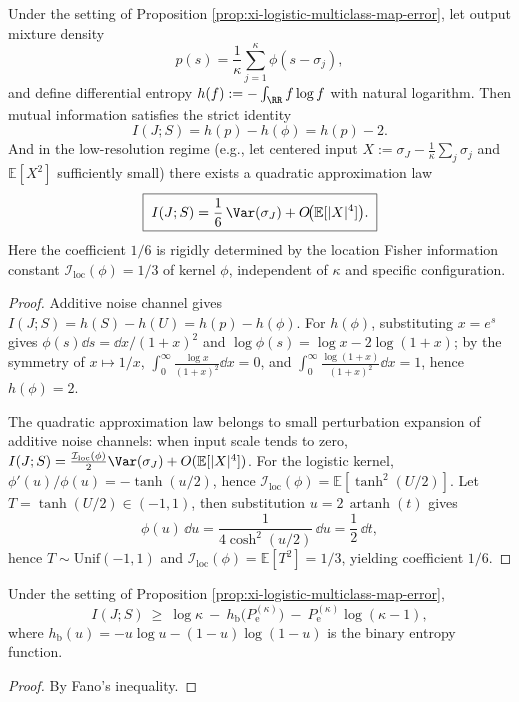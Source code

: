 \begin{proposition}\label{prop:xi-logistic-mutual-information-low-resolution}
Under the setting of Proposition \ref{prop:xi-logistic-multiclass-map-error}, let output mixture density
\[
p(s)=\frac{1}{\kappa}\sum_{j=1}^{\kappa}\phi(s-\sigma_j),
\]
and define differential entropy \(h(f):=-\int_{\RR}f\log f\) with natural logarithm.
Then mutual information satisfies the strict identity
\[
\boxed{\;I(J;S)=h(p)-h(\phi)=h(p)-2.\;}
\]
And in the low-resolution regime (e.g., let centered input \(X:=\sigma_J-\frac{1}{\kappa}\sum_{j}\sigma_j\) and \(\mathbb E[X^{2}]\) sufficiently small) there exists a quadratic approximation law
\[
\boxed{\;
I(J;S)=\frac{1}{6}\,\Var(\sigma_J)+O\!\bigl(\mathbb E[|X|^{4}]\bigr).\;}
\]
Here the coefficient \(1/6\) is rigidly determined by the location Fisher information constant \(\mathcal I_{\mathrm{loc}}(\phi)=1/3\) of kernel \(\phi\), independent of \(\kappa\) and specific configuration.
\end{proposition}
\begin{proof}
Additive noise channel gives \(I(J;S)=h(S)-h(U)=h(p)-h(\phi)\).
For \(h(\phi)\), substituting \(x=e^{s}\) gives \(\phi(s)\dd s=\dd x/(1+x)^{2}\) and
\(
\log\phi(s)=\log x-2\log(1+x)
\);
by the symmetry of \(x\mapsto 1/x\),
\(
\int_{0}^{\infty}\frac{\log x}{(1+x)^{2}}\dd x=0
\), and
\(
\int_{0}^{\infty}\frac{\log(1+x)}{(1+x)^{2}}\dd x=1
\), hence \(h(\phi)=2\).
\par
The quadratic approximation law belongs to small perturbation expansion of additive noise channels: when input scale tends to zero,
\(
I(J;S)=\frac{\mathcal I_{\mathrm{loc}}(\phi)}{2}\Var(\sigma_J)+O(\mathbb E[|X|^4])
\).
For the logistic kernel, \(\phi'(u)/\phi(u)=-\tanh(u/2)\), hence
\(
\mathcal I_{\mathrm{loc}}(\phi)=\mathbb E[\tanh^{2}(U/2)]
\).
Let \(T=\tanh(U/2)\in(-1,1)\), then substitution \(u=2\,\operatorname{artanh}(t)\) gives
\[
\phi(u)\,\dd u=\frac{1}{4\cosh^{2}(u/2)}\,\dd u=\frac12\,\dd t,
\]
hence \(T\sim\mathrm{Unif}(-1,1)\) and \(\mathcal I_{\mathrm{loc}}(\phi)=\mathbb E[T^{2}]=1/3\), yielding coefficient \(1/6\).
\end{proof}

\begin{corollary}\label{cor:xi-logistic-fano-lower-bound-from-error}
Under the setting of Proposition \ref{prop:xi-logistic-multiclass-map-error},
\[
I(J;S)\ \ge\ \log\kappa\ -\ h_{\mathrm b}\!\bigl(P_{\mathrm e}^{(\kappa)}\bigr)\ -\ P_{\mathrm e}^{(\kappa)}\log(\kappa-1),
\]
where \(h_{\mathrm b}(u)=-u\log u-(1-u)\log(1-u)\) is the binary entropy function.
\end{corollary}
\begin{proof}
By Fano's inequality.
\end{proof}

